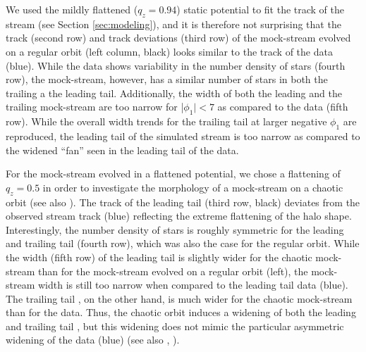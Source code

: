 \documentclass[twocolumn]{aastex62}
\newcommand{\sa}[1]{{\color{magenta} SP: #1}}
\begin{document}
\begin{figure}
{%
}
\label{fig:sims}
\end{figure}


We used the mildly flattened ($q_z = 0.94$) static potential to fit the track of the stream (see Section \ref{sec:modeling}), and it is therefore not surprising that the track (second row) and track deviations (third row) of the mock-stream evolved on a regular orbit (left column, black) looks similar to the track of the data (blue).  While the data shows variability in the number density of stars (fourth row), the mock-stream, however, has a similar number of stars in both the trailing a the leading tail. Additionally, the width of both the leading and the trailing mock-stream are too narrow for |$\phi_1| < 7$ as compared to the data (fifth row). While the overall width trends for the trailing tail  at larger negative $\phi_1$ are reproduced, the leading tail of the simulated stream is too narrow as compared to the widened ``fan'' seen in the leading tail of the data.

For the mock-stream evolved in a flattened potential, 
we chose a flattening of $q_z = 0.5$  in order to investigate the morphology of a mock-stream on a chaotic orbit (see also \citealt{Fardal:2015}). The track of the leading tail (third row, black) deviates from the observed stream track (blue) reflecting the extreme flattening of the halo shape. Interestingly, the number density of stars is roughly symmetric for the leading and trailing tail  (fourth row), which was also the case for the regular orbit. While the width (fifth row) of the leading tail is slightly wider for the chaotic mock-stream than for the mock-stream evolved on a regular orbit (left), the mock-stream width is still too narrow when compared to the leading tail data (blue). The trailing tail , on the other hand, is much wider for the chaotic mock-stream than for the data. Thus, the chaotic orbit induces a widening of both the leading and trailing tail , but this widening does not mimic the particular asymmetric widening of the data (blue) (see also \citealt{Pearson:2015}, \citealt{Price-Whelan:2016}).
\end{document}

